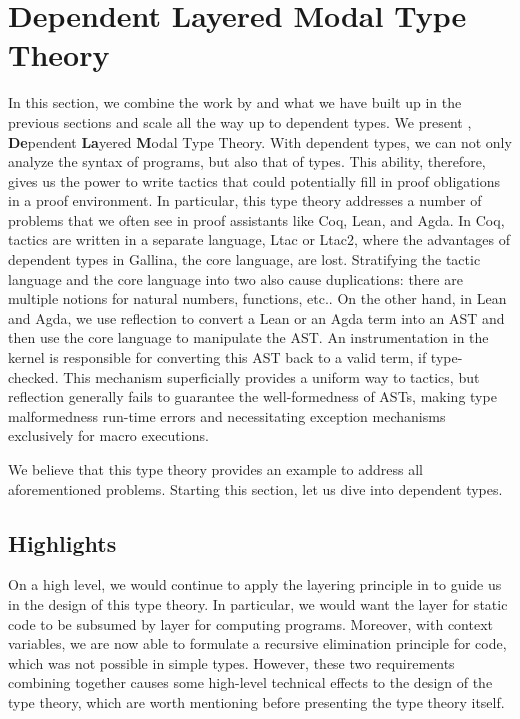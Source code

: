 \section{Dependent Layered Modal Type Theory}

In this section, we combine the work by \citet{hu2024layered} and what we have built
up in the previous sections and scale all the way up to dependent types. %
We present \delamlang, \textbf{De}pendent \textbf{La}yered \textbf{M}odal Type
Theory. %
With dependent types, we can not only analyze the syntax of programs, but also that of
types. %
This ability, therefore, gives us the power to write tactics that could potentially
fill in proof obligations in a proof environment. %
In particular, this type theory addresses a number of problems that we often see in
proof assistants like Coq, Lean, and Agda. %
In Coq, tactics are written in a separate language, Ltac or Ltac2, where the
advantages of dependent types in Gallina, the core language, are lost. %
Stratifying the tactic language and the core language into two also cause
duplications: there are multiple notions for natural numbers, functions, etc.. %
On the other hand, in Lean and Agda, we use reflection to convert a Lean or an Agda
term into an AST and then use the core language to manipulate the AST. %
An instrumentation in the kernel is responsible for converting this AST back to a
valid term, if type-checked. %
This mechanism superficially provides a uniform way to tactics, but reflection
generally fails to guarantee the well-formedness of ASTs, making type malformedness
run-time errors and necessitating exception mechanisms exclusively for macro executions.

We believe that this type theory provides an example to address all aforementioned
problems. %
Starting this section, let us dive into dependent types.

\subsection{Highlights}

On a high level, we would continue to apply the layering principle in \delamlang to
guide us in the design of this type theory. %
In particular, we would want the layer for static code to be subsumed by layer for
computing programs. %
Moreover, with context variables, we are now able to formulate a recursive
elimination principle for code, which was not possible in simple types. %
However, these two requirements combining together causes some high-level technical
effects to the design of the type theory, which are worth mentioning before presenting the
type theory itself.


